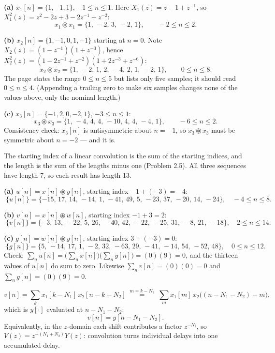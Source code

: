 
\textbf{(a)} $x_1[n]=\{1,-1,1\}$, $-1\le n\le 1$. Here $X_1(z)=z-1+z^{-1}$, so
$X_1^2(z)=z^{2}-2z+3-2z^{-1}+z^{-2}$:
\[
\boxed{\;x_1\circledast x_1=\{1,\,-2,\,3,\,-2,\,1\},\qquad -2\le n\le 2.\;}
\]

\textbf{(b)} $x_2[n]=\{1,-1,0,1,-1\}$ starting at $n=0$. Note
$X_2(z)=(1-z^{-1})(1+z^{-3})$, hence
$X_2^2(z)=(1-2z^{-1}+z^{-2})(1+2z^{-3}+z^{-6})$:
\[
\boxed{\;x_2\circledast x_2=\{1,\,-2,\,1,\,2,\,-4,\,2,\,1,\,-2,\,1\},\qquad 0\le n\le 8.\;}
\]
\Mis The page states the range $0\le n\le 5$ but lists only five samples; it should read
$0\le n\le 4$. (Appending a trailing zero to make six samples changes none of the values
above, only the nominal length.)

\textbf{(c)} $x_3[n]=\{-1,2,0,-2,1\}$, $-3\le n\le 1$:
\[
\boxed{\;x_3\circledast x_3=\{1,\,-4,\,4,\,4,\,-10,\,4,\,4,\,-4,\,1\},\qquad -6\le n\le 2.\;}
\]
Consistency check: $x_3[n]$ is antisymmetric about $n=-1$, so $x_3\circledast x_3$ must be
symmetric about $n=-2$ --- and it is.


The starting index of a linear convolution is the sum of the starting indices, and the length
is the sum of the lengths minus one (Problem 2.5). All three sequences have length 7, so each
result has length 13.

\textbf{(a)} $u[n]=x[n]\circledast y[n]$, starting index $-1+(-3)=-4$:
\[
\boxed{\;\{u[n]\}=\{-15,\,17,\,14,\,-14,\,1,\,-41,\,49,\,5,\,-23,\,37,\,-20,\,14,\,-24\},\quad -4\le n\le 8.\;}
\]

\textbf{(b)} $v[n]=x[n]\circledast w[n]$, starting index $-1+3=2$:
\[
\boxed{\;\{v[n]\}=\{-3,\,13,\,-22,\,5,\,26,\,-40,\,42,\,-22,\,-25,\,31,\,-8,\,21,\,-18\},\quad 2\le n\le 14.\;}
\]

\textbf{(c)} $g[n]=w[n]\circledast y[n]$, starting index $3+(-3)=0$:
\[
\boxed{\;\{g[n]\}=\{5,\,-14,\,17,\,1,\,-2,\,32,\,-63,\,29,\,-41,\,-14,\,54,\,-52,\,48\},\quad 0\le n\le 12.\;}
\]
Check: $\sum_n u[n]=\bigl(\sum_n x[n]\bigr)\bigl(\sum_n y[n]\bigr)=(0)(9)=0$, and the thirteen
values of $u[n]$ do sum to zero. Likewise $\sum_n v[n]=(0)(0)=0$ and
$\sum_n g[n]=(0)(9)=0$.


\[
v[n]=\sum_{k}x_1[k-N_1]\,x_2[n-k-N_2]
     \;\overset{m=k-N_1}{=}\;\sum_{m}x_1[m]\,x_2\bigl((n-N_1-N_2)-m\bigr),
\]
which is $y[\cdot]$ evaluated at $n-N_1-N_2$:
\[
\boxed{\;v[n]=y[n-N_1-N_2].\;}
\]
Equivalently, in the $z$-domain each shift contributes a factor $z^{-N_i}$, so
$V(z)=z^{-(N_1+N_2)}Y(z)$: convolution turns individual delays into one accumulated delay.

